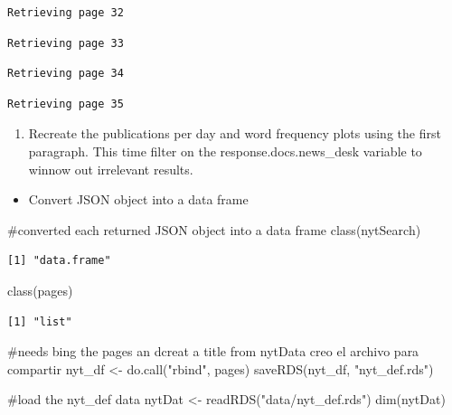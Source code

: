\documentclass[
  letterpaper,
  DIV=11,
  numbers=noendperiod]{scrartcl}
\newenvironment{Shaded}{\begin{snugshade}}{\end{snugshade}}
\newcommand{\CommentTok}[1]{\textcolor[rgb]{0.37,0.37,0.37}{#1}}
\newcommand{\FunctionTok}[1]{\textcolor[rgb]{0.28,0.35,0.67}{#1}}
\newcommand{\NormalTok}[1]{\textcolor[rgb]{0.00,0.23,0.31}{#1}}
\newcommand{\OtherTok}[1]{\textcolor[rgb]{0.00,0.23,0.31}{#1}}
\newcommand{\StringTok}[1]{\textcolor[rgb]{0.13,0.47,0.30}{#1}}
\providecommand{\tightlist}{%
  \setlength{\itemsep}{0pt}\setlength{\parskip}{0pt}}\usepackage{longtable,booktabs,array}
\begin{document}
\begin{verbatim}
Retrieving page 32
\end{verbatim}

\begin{verbatim}
Retrieving page 33
\end{verbatim}

\begin{verbatim}
Retrieving page 34
\end{verbatim}

\begin{verbatim}
Retrieving page 35
\end{verbatim}

\begin{enumerate}
\def\labelenumi{\arabic{enumi}.}
\setcounter{enumi}{2}
\tightlist
\item
  Recreate the publications per day and word frequency plots using the
  first paragraph. This time filter on the response.docs.news\_desk
  variable to winnow out irrelevant results.
\end{enumerate}

\begin{itemize}
\tightlist
\item
  Convert JSON object into a data frame
\end{itemize}

\begin{Shaded}
\begin{Highlighting}[]
\CommentTok{\#converted each returned JSON object into a data frame}
\FunctionTok{class}\NormalTok{(nytSearch)}
\end{Highlighting}
\end{Shaded}

\begin{verbatim}
[1] "data.frame"
\end{verbatim}

\begin{Shaded}
\begin{Highlighting}[]
\FunctionTok{class}\NormalTok{(pages)}
\end{Highlighting}
\end{Shaded}

\begin{verbatim}
[1] "list"
\end{verbatim}

\begin{Shaded}
\begin{Highlighting}[]
\CommentTok{\#needs bing the pages an dcreat a title from nytData creo el archivo para compartir}
\NormalTok{nyt\_df }\OtherTok{\textless{}{-}} \FunctionTok{do.call}\NormalTok{(}\StringTok{"rbind"}\NormalTok{, pages)}
\FunctionTok{saveRDS}\NormalTok{(nyt\_df, }\StringTok{"nyt\_def.rds"}\NormalTok{)}

\CommentTok{\#load the nyt\_def data}
\NormalTok{nytDat }\OtherTok{\textless{}{-}} \FunctionTok{readRDS}\NormalTok{(}\StringTok{"data/nyt\_def.rds"}\NormalTok{)}
\FunctionTok{dim}\NormalTok{(nytDat)}
\end{Highlighting}
\end{Shaded}
\end{document}
